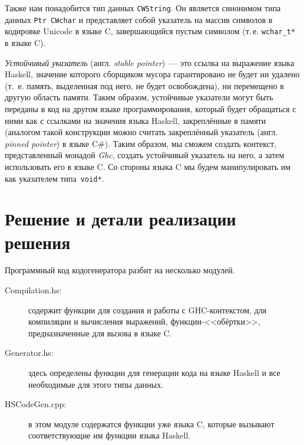 	Также нам понадобится тип данных \lstinline{CWString}. Он является синонимом типа данных \lstinline{Ptr CWchar} и представляет собой указатель на массив символов в кодировке Unicode в языке C, завершающийся пустым символом (т.\,е. \lstinline{wchar_t*} в языке C).
	
	\textit{Устойчивый указатель} (англ. \textit{stable pointer})~--- это ссылка на выражение языка Haskell, значение которого сборщиком мусора гарантировано не будет ни удалено (т.~е. память, выделенная под него, не будет освобождена), ни перемещено в другую область памяти. Таким образом, устойчивые указатели могут быть переданы в код на другом языке программирования, который будет обращаться с ними как с ссылками на значения языка Haskell, закреплённые в памяти (аналогом такой конструкции можно считать закреплённый указатель (англ. \textit{pinned pointer}) в языке C\#). Таким образом, мы сможем создать контекст, представленный монадой \textit{Ghc}, создать устойчивый указатель на него, а затем использовать его в языке C. Со стороны языка C мы будем манипулировать им как указателем типа~\lstinline{void*}.   %

\section{Решение и детали реализации решения}
Программный код кодогенератора разбит на несколько модулей. 
\begin{description}
	\item[Compilation.hs:] содержит функции для создания и работы с GHC-контекстом, для компиляции и вычисления выражений, функции-<<обёртки>>, предназначенные для вызова в языке C.
	\item[Generator.hs:] здесь определены функции для генерации кода на языке Haskell и все необходимые для этого типы данных.
	\item[HSCodeGen.cpp:] в этом модуле содержатся функции уже языка C, которые вызывают соответствующие им функции языка Haskell.
\end{description}
